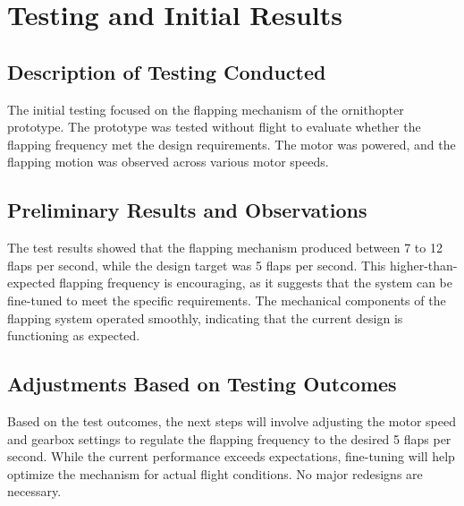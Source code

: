 \chapter{Testing and Initial Results}

\section{Description of Testing Conducted}
The initial testing focused on the flapping mechanism of the ornithopter prototype. The prototype was tested without flight to evaluate whether the flapping frequency met the design requirements. The motor was powered, and the flapping motion was observed across various motor speeds.

\section{Preliminary Results and Observations}
The test results showed that the flapping mechanism produced between 7 to 12 flaps per second, while the design target was 5 flaps per second. This higher-than-expected flapping frequency is encouraging, as it suggests that the system can be fine-tuned to meet the specific requirements. The mechanical components of the flapping system operated smoothly, indicating that the current design is functioning as expected.

\section{Adjustments Based on Testing Outcomes}
Based on the test outcomes, the next steps will involve adjusting the motor speed and gearbox settings to regulate the flapping frequency to the desired 5 flaps per second. While the current performance exceeds expectations, fine-tuning will help optimize the mechanism for actual flight conditions. No major redesigns are necessary.